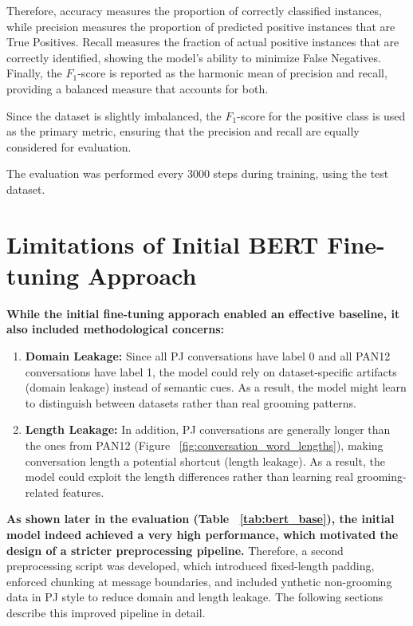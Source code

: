 Therefore, accuracy measures the proportion of correctly classified instances, while precision measures the proportion of predicted positive instances that are True Positives. 
Recall measures the fraction of actual positive instances that are correctly identified, showing the model's ability to minimize False Negatives. 
Finally, the $F_{1}$-score is reported as the harmonic mean of precision and recall, providing a balanced measure that accounts for both. 

Since the dataset is slightly imbalanced, the $F_{1}$-score for the positive class is used as the primary metric, ensuring that the precision and recall are equally considered for evaluation.

The evaluation was performed every 3000 steps during training, using the test dataset.


\section{Limitations of Initial BERT Fine-tuning Approach}

\textbf{While the initial fine-tuning apporach enabled an effective baseline, it also included methodological concerns:}
\begin{enumerate}
  \item \textbf{Domain Leakage:} Since all PJ conversations have label 0 and all PAN12 conversations have label 1, the model could rely on dataset-specific artifacts (domain leakage) instead of semantic cues. As a result, the model might learn to distinguish between datasets rather than real grooming patterns.
  \item \textbf{Length Leakage:} In addition, PJ conversations are generally longer than the ones from PAN12 (Figure ~\ref{fig:conversation_word_lengths}), making conversation length a potential shortcut (length leakage). As a result, the model could exploit the length differences rather than learning real grooming-related features.
\end{enumerate}

\textbf{As shown later in the evaluation (Table ~\ref{tab:bert_base}), the initial model indeed achieved a very high performance, which motivated the design of a stricter preprocessing pipeline.} Therefore, a second preprocessing script was developed, which introduced fixed-length padding, enforced chunking at message boundaries, and included ynthetic non-grooming data in PJ style to reduce domain and length leakage. The following sections describe this improved pipeline in detail.

